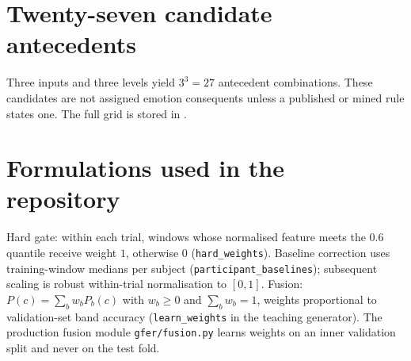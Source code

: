 \section{Twenty-seven candidate antecedents}
Three inputs and three levels yield $3^3=27$ antecedent combinations. These candidates are not assigned emotion consequents unless a published or mined rule states one. The full grid is stored in .

\section{Formulations used in the repository}
Hard gate: within each trial, windows whose normalised feature meets the $0.6$ quantile receive weight $1$, otherwise $0$ (\texttt{hard\_weights}).
Baseline correction uses training-window medians per subject (\texttt{participant\_baselines}); subsequent scaling is robust within-trial normalisation to $[0,1]$.
Fusion: $P(c)=\sum_b w_b P_b(c)$ with $w_b\ge 0$ and $\sum_b w_b=1$, weights proportional to validation-set band accuracy (\texttt{learn\_weights} in the teaching generator). The production fusion module \texttt{gfer/fusion.py} learns weights on an inner validation split and never on the test fold.

